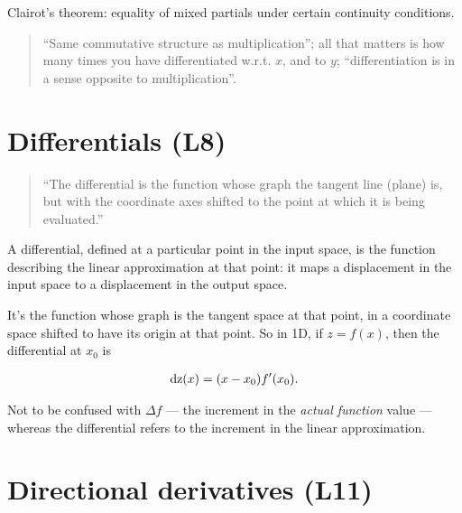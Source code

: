 \documentclass[12pt]{article}
\begin{document}
Clairot's theorem: equality of mixed partials under certain continuity
conditions.

\begin{quote}
``Same commutative structure as multiplication''; all that matters
is how many times you have differentiated w.r.t. $x$, and to $y$;
``differentiation is in a sense opposite to multiplication''.
\end{quote}

\section*{Differentials (L8)}

\begin{quote}
  ``The differential is the function whose graph the tangent line (plane) is,
  but with the coordinate axes shifted to the point at which it is being
  evaluated.''
\end{quote}

A differential, defined at a particular point in the input space, is the
function describing the linear approximation at that point: it maps a
displacement in the input space to a displacement in the output space.

It's the function whose graph is the tangent space at that point, in a
coordinate space shifted to have its origin at that point. So in 1D, if
$z = f(x)$, then the differential at $x_0$ is

\begin{align*}
  \operatorname{\text{dz}}(x) = (x - x_0)f'(x_0).
\end{align*}


Not to be confused with $\Delta f$ --- the increment in the \textit{actual
  function} value --- whereas the differential refers to the increment in the
linear approximation.


\section*{Directional derivatives (L11)}


\end{document}
